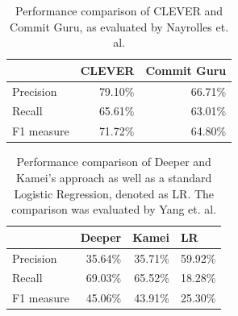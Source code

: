 
\begin{table}[t]
	\centering
	\caption{Performance comparison of CLEVER and Commit Guru, as evaluated by Nayrolles et. al. \cite{Nayrolles2018}}
	\begin{tabular}{@{}lrr@{}}
		\toprule
		& \multicolumn{1}{l}{CLEVER} & \multicolumn{1}{l}{Commit Guru} \\ \midrule
		Precision  & 79.10\%                    & 66.71\%                         \\
		Recall     & 65.61\%                    & 63.01\%                         \\
		F1 measure & 71.72\%                    & 64.80\%                         \\ \bottomrule
	\end{tabular}
	\label{tab:perfclever}
\end{table}

\begin{table}[t]
	\centering
	\caption{Performance comparison of Deeper and Kamei's approach as well as a standard Logistic Regression, denoted as LR. The comparison was evaluated by Yang et. al. \cite{Yang2015}}
	\begin{tabular}{@{}lrrr@{}}
		\toprule
		& \multicolumn{1}{l}{Deeper} & \multicolumn{1}{l}{Kamei} & \multicolumn{1}{l}{LR} \\ \midrule
		Precision  & 35.64\%                    & 35.71\%                   & 59.92\%                \\
		Recall     & 69.03\%                    & 65.52\%                   & 18.28\%                \\
		F1 measure & 45.06\%                    & 43.91\%                   & 25.30\%                \\ \bottomrule
	\end{tabular}
	\label{tab:perfdeeper}
\end{table}


